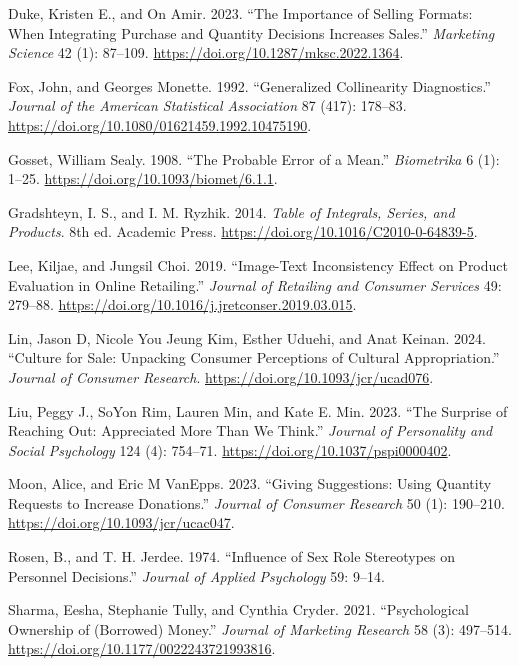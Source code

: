 \documentclass[
  11pt,
  letterpaper,
]{scrbook}
\newlength{\cslhangindent}
\newenvironment{CSLReferences}[2] %
 {\begin{list}{}{%
  \setlength{\itemindent}{0pt}
  \setlength{\leftmargin}{0pt}
  \setlength{\parsep}{0pt}
  \ifodd #1
   \setlength{\leftmargin}{\cslhangindent}
   \setlength{\itemindent}{-1\cslhangindent}
  \fi
  \setlength{\itemsep}{#2\baselineskip}}}
 {\end{list}}
\theoremstyle{plain}
\theoremstyle{definition}
\theoremstyle{definition}
\theoremstyle{plain}
\theoremstyle{remark}
\begin{document}
\begin{CSLReferences}{1}{0}
Duke, Kristen E., and On Amir. 2023. {``The Importance of Selling
Formats: When Integrating Purchase and Quantity Decisions Increases
Sales.''} \emph{Marketing Science} 42 (1): 87--109.
\url{https://doi.org/10.1287/mksc.2022.1364}.

Fox, John, and Georges Monette. 1992. {``Generalized Collinearity
Diagnostics.''} \emph{Journal of the American Statistical Association}
87 (417): 178--83. \url{https://doi.org/10.1080/01621459.1992.10475190}.

Gosset, William Sealy. 1908. {``The Probable Error of a Mean.''}
\emph{Biometrika} 6 (1): 1--25.
\url{https://doi.org/10.1093/biomet/6.1.1}.

Gradshteyn, I. S., and I. M. Ryzhik. 2014. \emph{Table of Integrals,
Series, and Products}. 8th ed. Academic Press.
\url{https://doi.org/10.1016/C2010-0-64839-5}.

Lee, Kiljae, and Jungsil Choi. 2019. {``Image-Text Inconsistency Effect
on Product Evaluation in Online Retailing.''} \emph{Journal of Retailing
and Consumer Services} 49: 279--88.
\url{https://doi.org/10.1016/j.jretconser.2019.03.015}.

Lin, Jason D, Nicole You Jeung Kim, Esther Uduehi, and Anat Keinan.
2024. {``Culture for Sale: Unpacking Consumer Perceptions of Cultural
Appropriation.''} \emph{Journal of Consumer Research}.
\url{https://doi.org/10.1093/jcr/ucad076}.

Liu, Peggy J., SoYon Rim, Lauren Min, and Kate E. Min. 2023. {``The
Surprise of Reaching Out: Appreciated More Than We Think.''}
\emph{Journal of Personality and Social Psychology} 124 (4): 754--71.
\url{https://doi.org/10.1037/pspi0000402}.

Moon, Alice, and Eric M VanEpps. 2023. {``Giving Suggestions: Using
Quantity Requests to Increase Donations.''} \emph{Journal of Consumer
Research} 50 (1): 190--210. \url{https://doi.org/10.1093/jcr/ucac047}.

Rosen, B., and T. H. Jerdee. 1974. {``Influence of Sex Role Stereotypes
on Personnel Decisions.''} \emph{Journal of Applied Psychology} 59:
9--14.

Sharma, Eesha, Stephanie Tully, and Cynthia Cryder. 2021.
{``Psychological Ownership of (Borrowed) Money.''} \emph{Journal of
Marketing Research} 58 (3): 497--514.
\url{https://doi.org/10.1177/0022243721993816}.


\end{CSLReferences}
\end{document}
